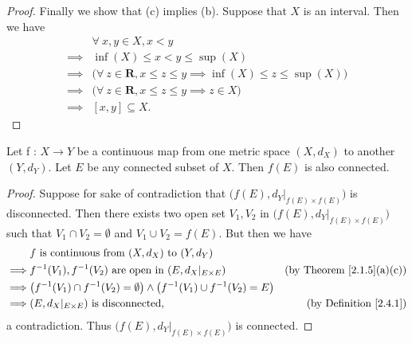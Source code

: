 \begin{proof}
    Finally we show that (c) implies (b).
    Suppose that \(X\) is an interval.
    Then we have
    \begin{align*}
                 & \forall\ x, y \in X, x < y                                                                \\
        \implies & \inf(X) \leq x < y \leq \sup(X)                                                           \\
        \implies & \big(\forall\ z \in \mathbf{R}, x \leq z \leq y \implies \inf(X) \leq z \leq \sup(X)\big) \\
        \implies & \big(\forall\ z \in \mathbf{R}, x \leq z \leq y \implies z \in X\big)                     \\
        \implies & [x, y] \subseteq X.
    \end{align*}
\end{proof}

\begin{theorem}\label{2.4.6}
    Let f : \(X \to Y\) be a continuous map from one metric space \((X, d_X)\) to another \((Y, d_Y)\).
    Let \(E\) be any connected subset of \(X\).
    Then \(f(E)\) is also connected.
\end{theorem}

\begin{proof}
    Suppose for sake of contradiction that \(\big(f(E), d_Y|_{f(E) \times f(E)}\big)\) is disconnected.
    Then there exists two open set \(V_1, V_2\) in \(\big(f(E), d_Y|_{f(E) \times f(E)}\big)\) such that \(V_1 \cap V_2 = \emptyset\) and \(V_1 \cup V_2 = f(E)\).
    But then we have
    \begin{align*}
                 & f \text{ is continuous from } (X, d_X) \text{ to } (Y, d_Y)                                                                                 \\
        \implies & f^{-1}(V_1), f^{-1}(V_2) \text{ are open in } (E, d_X|_{E \times E})                                & \text{(by Theorem \ref{2.1.5}(a)(c))} \\
        \implies & \big(f^{-1}(V_1) \cap f^{-1}(V_2) = \emptyset\big) \land \big(f^{-1}(V_1) \cup f^{-1}(V_2) = E\big)                                         \\
        \implies & (E, d_X|_{E \times E}) \text{ is disconnected},                                                     & \text{(by Definition \ref{2.4.1})}
    \end{align*}
    a contradiction.
    Thus \(\big(f(E), d_Y|_{f(E) \times f(E)}\big)\) is connected.
\end{proof}